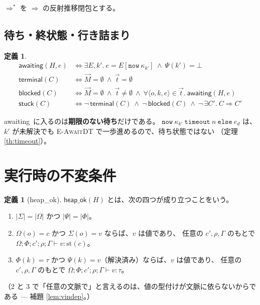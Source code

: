 \documentclass[11pt,a4paper]{ltjsarticle}
\theoremstyle{definition}
\newtheorem{definition}[theorem]{定義}
\theoremstyle{remark}
\newcommand{\Om}{\Omega}
\newcommand{\Sm}{\Sigma}
\newcommand{\Ph}{\Phi}
\newcommand{\Ps}{\Psi}
\newcommand{\styp}{\mathrm{st}}
\newcommand{\mtab}{\mathrm{mt}}
\newcommand{\mbody}{\mathrm{mb}}
\newcommand{\heapok}{\textsf{heap\_ok}}
\newcommand{\stuck}{\textsf{stuck}}
\newcommand{\blocked}{\textsf{blocked}}
\newcommand{\terminal}{\textsf{terminal}}
\newcommand{\awaiting}{\textsf{awaiting}}
\newcommand{\cstep}{\Longrightarrow}
\newcommand{\subs}[2]{[#1 \mapsto #2]}
\begin{document}

$\cstep^{*}$ を $\cstep$ の反射推移閉包とする。

\subsection{待ち・終状態・行き詰まり}

\begin{definition}\label{def:states}
\begin{align*}
\awaiting(H, e) &\iff \exists E, k'.\ e = E[\mathtt{now}\ \kappa_{k'}] \ \wedge\ \Ps(k') = \bot \\
\terminal(C) &\iff \vec{M} = \emptyset \ \wedge\ \vec{t} = \emptyset \\
\blocked(C) &\iff \vec{M} = \emptyset \ \wedge\ \vec{t} \neq \emptyset
   \ \wedge\ \forall \langle o,k,e\rangle \in \vec{t}.\ \awaiting(H,e) \\
\stuck(C) &\iff \neg\,\terminal(C) \ \wedge\ \neg\,\blocked(C)
   \ \wedge\ \neg\,\exists C'.\ C \cstep C'
\end{align*}
\end{definition}

\awaiting\ に入るのは\textbf{期限のない待ち}だけである。
$\mathtt{now}\ \kappa_{k'}\ \mathtt{timeout}\ n\ \mathtt{else}\ e_d$ は、
$k'$ が未解決でも \textsc{E-AwaitDT} で一歩進めるので、待ち状態ではない
（定理 \ref{th:timeout}）。

\section{実行時の不変条件}

\begin{definition}[\heapok]\label{def:heapok}
$\heapok(H)$ とは、次の四つが成り立つことをいう。
\begin{enumerate}
\item $|\Sm| = |\Om|$ かつ $|\Ps| = |\Ph|$。
\item $\Om(o) = c$ かつ $\Sm(o) = v$ ならば、$v$ は値であり、
      任意の $c',\rho,\Gamma$ のもとで $\Om;\Ph;c';\rho;\Gamma \vdash v : \styp(c)$。
\item $\Ph(k) = \tau$ かつ $\Ps(k) = v$（解決済み）ならば、$v$ は値であり、
      任意の $c',\rho,\Gamma$ のもとで $\Om;\Ph;c';\rho;\Gamma \vdash v : \tau$。
\end{enumerate}
（2 と 3 で「任意の文脈で」と言えるのは、値の型付けが文脈に依らないからである
--- 補題 \ref{lem:vindep}。）
\end{definition}
\end{document}
